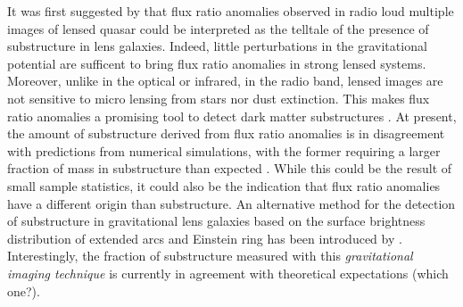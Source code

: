 \documentclass[manuscript]{emulateapj}
\newcommand{\simona}[1]{\textcolor{simonacolor}{#1}}
\begin{document}
\simona{It was first suggested by \citet{Mao1998} that flux ratio anomalies observed in radio loud multiple images of lensed quasar could be interpreted as the telltale of the presence of substructure in lens galaxies.}
\simona{Indeed,} little perturbations in the gravitational potential are sufficent to bring flux ratio anomalies in strong lensed systems. 
\simona{Moreover, unlike in the optical or infrared,} in the radio band, lensed images are not sensitive to micro lensing from stars \simona{nor dust extinction}. 
This makes flux ratio anomalies a promising tool to detect dark matter substructures \citep{Dalal2002, N13}.  
\simona{At present, the amount of substructure derived from flux ratio anomalies is in disagreement with predictions from numerical simulations, with the former requiring a larger fraction of mass in substructure than expected \citet{Xu14}. While this could be the result of small sample statistics, it could also be the indication that flux ratio anomalies have a different origin than substructure.} \simona{An alternative method for the detection of substructure in gravitational lens galaxies based on the surface brightness distribution of extended arcs and Einstein ring has been introduced by \citet{K05,V09}. Interestingly, the fraction of substructure measured with this \emph{gravitational imaging technique} is currently in agreement with theoretical expectations \citep{V14a} (which one?).} 
\end{document}
